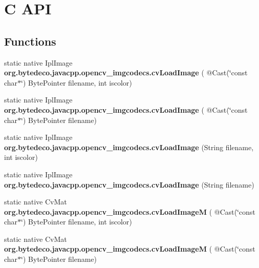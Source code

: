 \hypertarget{group__imgcodecs__c}{}\section{C A\+PI}
\label{group__imgcodecs__c}
\subsection*{Functions}
\begin{DoxyCompactItemize}
\item 
\mbox{\label{group__imgcodecs__c_gaee88cc3211c2d142b02a91aad459e453}} 
static native Ipl\+Image {\bfseries org.\+bytedeco.\+javacpp.\+opencv\+\_\+imgcodecs.\+cv\+Load\+Image} ( @Cast(\char`\"{}const char$\ast$\char`\"{}) Byte\+Pointer filename, int iscolor)
\item 
\mbox{\label{group__imgcodecs__c_gafe43ea222d8fe270ee0c93365a7de5f7}} 
static native Ipl\+Image {\bfseries org.\+bytedeco.\+javacpp.\+opencv\+\_\+imgcodecs.\+cv\+Load\+Image} ( @Cast(\char`\"{}const char$\ast$\char`\"{}) Byte\+Pointer filename)
\item 
\mbox{\label{group__imgcodecs__c_ga3dc0c3c10155d61ae994b4842399231c}} 
static native Ipl\+Image {\bfseries org.\+bytedeco.\+javacpp.\+opencv\+\_\+imgcodecs.\+cv\+Load\+Image} (String filename, int iscolor)
\item 
\mbox{\label{group__imgcodecs__c_ga1543534f87b1d4a45336a558154ae3f2}} 
static native Ipl\+Image {\bfseries org.\+bytedeco.\+javacpp.\+opencv\+\_\+imgcodecs.\+cv\+Load\+Image} (String filename)
\item 
\mbox{\label{group__imgcodecs__c_ga68f83a9049c0a159559b8db5acd0756d}} 
static native Cv\+Mat {\bfseries org.\+bytedeco.\+javacpp.\+opencv\+\_\+imgcodecs.\+cv\+Load\+ImageM} ( @Cast(\char`\"{}const char$\ast$\char`\"{}) Byte\+Pointer filename, int iscolor)
\item 
\mbox{\label{group__imgcodecs__c_ga5915795599c1efd9e6505c5cf6d2861d}} 
static native Cv\+Mat {\bfseries org.\+bytedeco.\+javacpp.\+opencv\+\_\+imgcodecs.\+cv\+Load\+ImageM} ( @Cast(\char`\"{}const char$\ast$\char`\"{}) Byte\+Pointer filename)

\end{DoxyCompactItemize}
